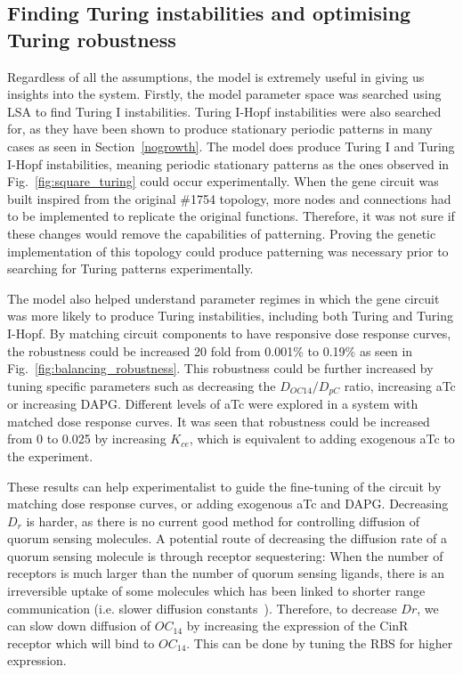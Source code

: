 \subsection{Finding Turing instabilities and optimising Turing robustness}

Regardless of all the assumptions, the model is extremely useful in giving us insights into the system.
Firstly, the model parameter space was searched using LSA to find Turing I instabilities.
Turing I-Hopf instabilities were also searched for, as they have been shown to produce stationary periodic patterns in many cases as seen in Section~\ref{nogrowth}.
The model does produce Turing I and Turing I-Hopf instabilities, meaning periodic stationary patterns as the ones observed in Fig.~\ref{fig:square_turing} could occur experimentally.
When the gene circuit was built inspired from the original \#1754 topology,
more nodes and connections had to be implemented to replicate the original functions.
Therefore, it was not sure if these changes would remove the capabilities of patterning.
Proving the genetic implementation of this topology could produce patterning was necessary prior to searching for Turing patterns experimentally.

The model also helped understand parameter regimes in which the gene circuit was more likely to produce Turing instabilities, including both Turing and Turing I-Hopf.
By matching circuit components to have responsive dose response curves, the robustness could be increased 20 fold from 0.001\% to 0.19\% as seen in Fig.~\ref{fig:balancing_robustness}.
This robustness could be further increased by tuning specific parameters such as decreasing the $D_{OC14}/D_{pC}$ ratio, increasing aTc or increasing DAPG.
Different levels of aTc were explored in a system with matched dose response curves.
It was seen that robustness could be increased from 0 to 0.025 by increasing $K_{ce}$, which is equivalent to adding exogenous aTc to the experiment.


These results can help experimentalist to guide the fine-tuning of the circuit by matching dose response curves, or adding exogenous aTc and DAPG.
Decreasing $D_{r}$ is harder, as there is no current good method for controlling diffusion of quorum sensing molecules.
A potential route of decreasing the diffusion rate of a quorum sensing molecule is through receptor sequestering:
When the number of receptors is much larger than the number of quorum sensing ligands,
there is an irreversible uptake of some molecules which has been linked to shorter range communication (i.e. slower diffusion constants~\parencite{vangestel}).
Therefore, to decrease $D{r}$,
we can slow down diffusion of $OC_{14}$ by increasing the expression of the CinR receptor which will bind to $OC_{14}$.
This can be done by tuning the RBS for higher expression.

